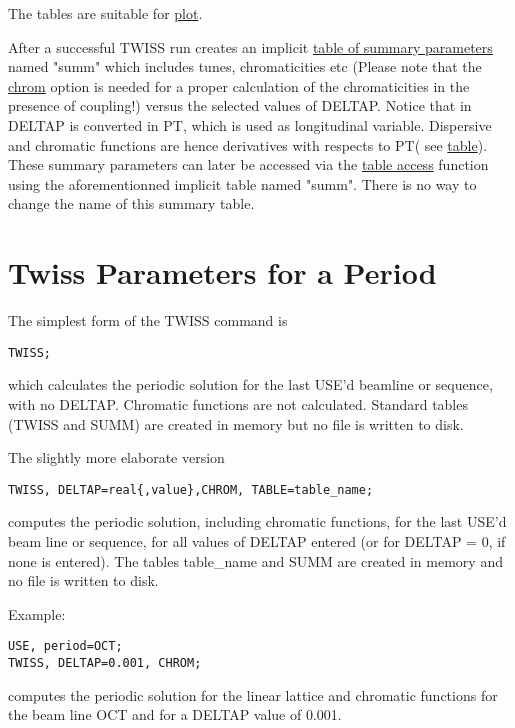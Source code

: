 The tables are suitable for \href{../plot/plot.html}{plot}.   

After a
successful TWISS run \madx creates an implicit
\href{../Introduction/tables.html#summ}{table of summary parameters}
named "summ" which includes tunes, chromaticities etc (Please note that
the \href{../Introduction/tables.html#chrom}{chrom} option is needed
for a proper calculation of the chromaticities in the presence of
coupling!) versus the selected values of DELTAP. Notice that in \madx
DELTAP is converted in PT, which is used as longitudinal
variable. Dispersive and chromatic functions are hence derivatives with
respects to PT( see
\href{../Introduction/tables.html#summ}{table}). These summary
parameters can later be accessed via the
\href{../Introduction/expression.html#table}{table access} function
using the aforementionned implicit table named "summ". There is no way
to change the name of this summary table.  

\section{Twiss Parameters for a Period}
The simplest form of the TWISS command is
\begin{verbatim}
TWISS;
\end{verbatim}
which calculates the periodic solution for the last USE'd beamline or sequence, with no DELTAP.
Chromatic functions are not calculated. 
Standard tables (TWISS and SUMM) are created in memory but no file is written to disk.

The slightly more elaborate version 
\begin{verbatim}
TWISS, DELTAP=real{,value},CHROM, TABLE=table_name;
\end{verbatim}
computes the periodic solution, including chromatic functions, for the last USE'd beam
line or sequence, for all values of DELTAP entered
(or for DELTAP = 0, if none is entered). 
The tables table\_name and SUMM are created in memory and no file is written to disk.

Example: 
\begin{verbatim}
USE, period=OCT;
TWISS, DELTAP=0.001, CHROM;
\end{verbatim}
computes the periodic solution for the linear lattice and
chromatic functions for the beam line OCT and for a DELTAP value of
0.001. 


